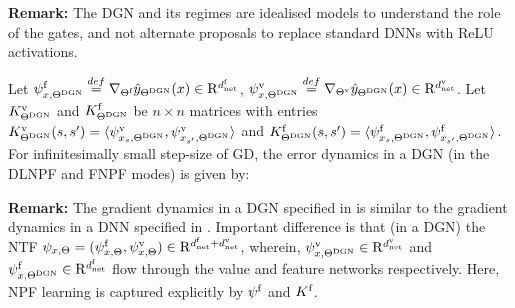 \documentclass{article}
\begin{document}
\textbf{Remark:} The DGN and its regimes are idealised models to understand the role of the gates, and not alternate proposals to replace standard DNNs with ReLU activations. 
\begin{proposition}\label{prop:dgn} Let $\psi^{\text{f}}_{x,\Theta^{\text{DGN}}}\stackrel{def}=\nabla_{\Theta^{\textrm{f}}}\hat{y}_{\Theta^{\text{DGN}}}(x) \in \mathrm{R}^{d^{\text{f}}_{\text{net}}}$, $\psi^{\text{v}}_{x,\Theta^{\text{DGN}}}\stackrel{def}=\nabla_{{\Theta}^{\text{v}}}\hat{y}_{\Theta^{\text{DGN}}}(x) \in \mathrm{R}^{d^{\text{v}}_{\text{net}}}$. Let $K^{\text{v}}_{\Theta^{\text{DGN}}}$ and $K^{\text{f}}_{\Theta^{\text{DGN}}}$ be $n\times n$ matrices with entries $K^{\text{v}}_{\Theta^{\text{DGN}}}(s,s')=\langle \psi^{\text{v}}_{x_s,\Theta^{\text{DGN}}},\psi^{\text{v}}_{x_{s'},\Theta^{\text{DGN}}}\rangle$ and $K^{\text{f}}_{\Theta^{\text{DGN}}}(s,s')=\langle \psi^{\text{f}}_{x_s,\Theta^{\text{DGN}}},\psi^{\text{f}}_{x_{s'},\Theta^{\text{DGN}}}\rangle$. For infinitesimally small step-size of GD, the error dynamics in a DGN (in the DLNPF and FNPF modes) is given by:
\FloatBarrier
\begin{table}[h]
\end{table}
\end{proposition}
\textbf{Remark:} The gradient dynamics in a DGN specified in  is similar to the gradient dynamics in a DNN specified in . Important difference is that (in a DGN) the NTF $\psi_{x,\Theta}=(\psi^{\text{f}}_{x,\Theta},\psi^{\text{v}}_{x,\Theta})\in\mathrm{R}^{d^{\text{f}}_{\text{net}}+d^{\text{v}}_{\text{net}}}$, wherein, $\psi^{\text{v}}_{x,\Theta^{\text{DGN}}}\in\mathrm{R}^{d^{\text{v}}_{\text{net}}}$ and $\psi^{\text{f}}_{x,\Theta^{\text{DGN}}}\in\mathrm{R}^{d^{\text{f}}_{\text{net}}}$ flow through the value and feature networks respectively. Here, NPF learning is captured explicitly by $\psi^{\text{f}}$ and $K^{\text{f}}$. 
\end{document}
